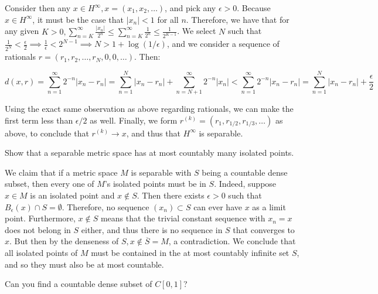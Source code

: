 \begin{solution}
    Consider then any $x \in H^{\infty}, x = (x_1, x_2, \ldots)$, and pick any $\epsilon > 0$.
    Because $x \in H^{\infty}$, it must be the case that $\lvert x_n \rvert < 1$ for all $n$.
    Therefore, we have that for any given $K > 0, \sum_{n = K}^{\infty} \frac{\lvert x_n \rvert}{2^n} \leq \sum_{n = K}^{\infty} \frac{1}{2^n} \leq \frac{1}{2^{K - 1}}$.
    We select $N$ such that $\frac{1}{2^{N}} < \frac{\epsilon}{2} \implies \frac{1}{\epsilon} < 2^{N - 1} \implies N > 1 + \log(1/\epsilon)$, and we consider a sequence of rationals $r = (r_1, r_2, \ldots, r_N, 0, 0, \ldots)$.
    Then:

    $$d(x, r) = \sum_{n=1}^{\infty} 2^{-n} \lvert x_n - r_n \rvert = \sum_{n=1}^{N} \lvert x_n - r_n \rvert + \sum_{n=N+1}^{\infty}2^{-n} \lvert x_n \rvert < \sum_{n=1}^{\infty} 2^{-n} \lvert x_n - r_n \rvert = \sum_{n=1}^{N} \lvert x_n - r_n \rvert + \frac{\epsilon}{2}$$

    Using the exact same observation as above regarding rationals, we can make the first term less than $\epsilon/2$ as well.
    Finally, we form $r^{(k)} = (r_1, r_{1/2}, r_{1/3}, \ldots)$ as above, to conclude that $r^{(k)} \rightarrow x$, and thus that $H^{\infty}$ is separable.
\end{solution}

\begin{exercise}{51}
    Show that a separable metric space has at most countably many isolated points.
\end{exercise}

\begin{solution}
    
    We claim that if a metric space $M$ is separable with $S$ being a countable dense subset, then every one of $M$'s isolated points must be in $S$.
    Indeed, suppose $x \in M$ is an isolated point and $x \notin S$.
    Then there exists $\epsilon > 0$ such that $B_{\epsilon}(x) \cap S = \emptyset$.
    Therefore, no sequence $(x_n) \subset S$ can ever have $x$ as a limit point.
    Furthermore, $x \notin S$ means that the trivial constant sequence with $x_n = x$ does not belong in $S$ either, and thus there is no sequence in $S$ that converges to $x$.
    But then by the denseness of $S, x \notin \overline{S} = M$, a contradiction.
    We conclude that all isolated points of $M$ must be contained in the at most countably infinite set $S$, and so they must also be at most countable.
\end{solution}

\begin{exercise}{53}
    Can you find a countable dense subset of $C[0, 1]$?
\end{exercise}


